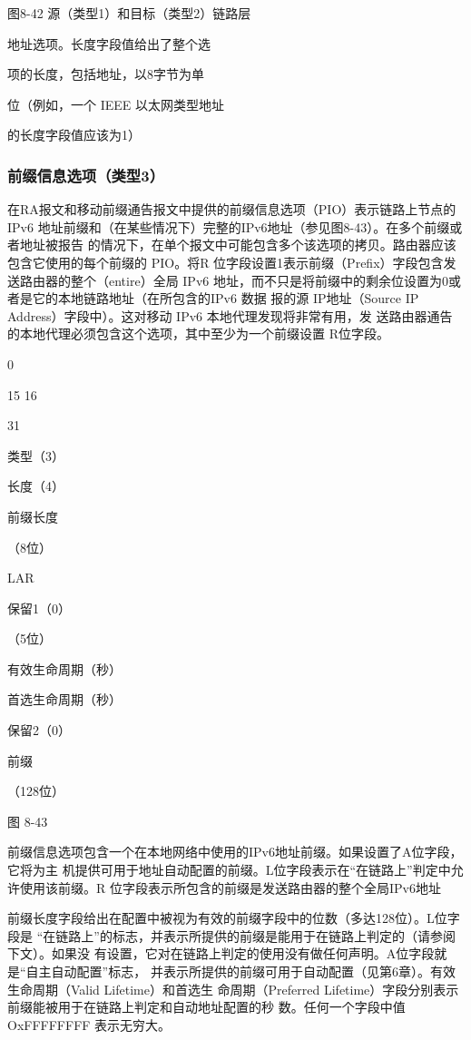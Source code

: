 图8-42 源（类型1）和目标（类型2）链路层

地址选项。长度字段值给出了整个选

项的长度，包括地址，以8字节为单

位（例如，一个 IEEE 以太网类型地址

的长度字段值应该为1）

\subsubsection{前缀信息选项（类型3）}
在RA报文和移动前缀通告报文中提供的前缀信息选项（PIO）表示链路上节点的IPv6
地址前缀和（在某些情况下）完整的IPv6地址（参见图8-43）。在多个前缀或者地址被报告
的情况下，在单个报文中可能包含多个该选项的拷贝。路由器应该包含它使用的每个前缀的
PIO。将R 位字段设置1表示前缀（Prefix）字段包含发送路由器的整个（entire）全局 IPv6
地址，而不只是将前缀中的剩余位设置为0或者是它的本地链路地址（在所包含的IPv6 数据
报的源 IP地址（Source IP Address）字段中）。这对移动 IPv6 本地代理发现将非常有用，发
送路由器通告的本地代理必须包含这个选项，其中至少为一个前缀设置 R位字段。

0

15 16

31

类型（3）

长度（4）

前缀长度

（8位）

LAR

保留1（0）

（5位）

有效生命周期（秒）

首选生命周期（秒）

保留2（0）

前缀

（128位）

图 8-43

前缀信息选项包含一个在本地网络中使用的IPv6地址前缀。如果设置了A位字段，它将为主
机提供可用于地址自动配置的前缀。L位字段表示在“在链路上”判定中允许使用该前缀。R
位字段表示所包含的前缀是发送路由器的整个全局IPv6地址

前缀长度字段给出在配置中被视为有效的前缀字段中的位数（多达128位）。L位字段是
“在链路上”的标志，并表示所提供的前缀是能用于在链路上判定的（请参阅下文）。如果没
有设置，它对在链路上判定的使用没有做任何声明。A位字段就是“自主自动配置”标志，
并表示所提供的前缀可用于自动配置（见第6章）。有效生命周期（Valid Lifetime）和首选生
命周期（Preferred Lifetime）字段分别表示前缀能被用于在链路上判定和自动地址配置的秒
数。任何一个字段中值 OxFFFFFFFF 表示无穷大。

